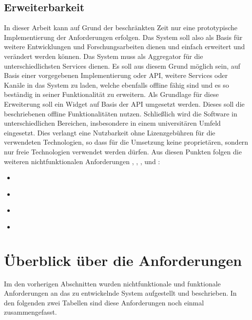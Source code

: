 \subsection{Erweiterbarkeit}
In dieser Arbeit kann auf Grund der beschränkten Zeit nur eine prototypische Implementierung der Anforderungen erfolgen. Das System soll also als Basis für weitere Entwicklungen und Forschungsarbeiten dienen und einfach erweitert und verändert werden können. Das System muss als Aggregator für die unterschiedlichsten Services dienen. Es soll aus diesem Grund möglich sein, auf Basis einer vorgegebenen Implementierung oder \ac{API}, weitere Services oder Kanäle in das System zu laden, welche ebenfalls offline fähig sind und es so beständig in seiner Funktionalität zu erweitern. Als Grundlage für diese Erweiterung soll ein Widget auf Basis der \ac{API} umgesetzt werden. Dieses soll die beschriebenen offline Funktionalitäten nutzen. Schließlich wird die Software in unterschiedlichen Bereichen, insbesondere in einem universitären Umfeld eingesetzt. Dies verlangt eine Nutzbarkeit ohne Lizenzgebühren für die verwendeten Technologien, so dass für die Umsetzung keine proprietären, sondern nur freie Technologien verwendet werden dürfen. Aus diesen Punkten folgen die weiteren nichtfunktionalen Anforderungen , , , und :
\begin{itemize}
 \item \requirementnf{\requirementNewWidgetsWithApi}\label{requirementNewWidgetsWithApi}
 \item \requirementnf{\requirementExampleWidget}\label{requirementExampleWidget}
 \item \requirementnf{\requirementExtensibility}\label{requirementExtensibility}
 \item \requirementnf{\requirementOpenSource}\label{requirementOpenSource}
\end{itemize}

\section{Überblick über die Anforderungen}
Im den vorherigen Abschnitten wurden nichtfunktionale und funktionale Anforderungen an das zu entwickelnde System aufgestellt und beschrieben. In den folgenden zwei Tabellen sind diese Anforderungen noch einmal zusammengefasst.

\renewcommand{\arraystretch}{1.4} 

